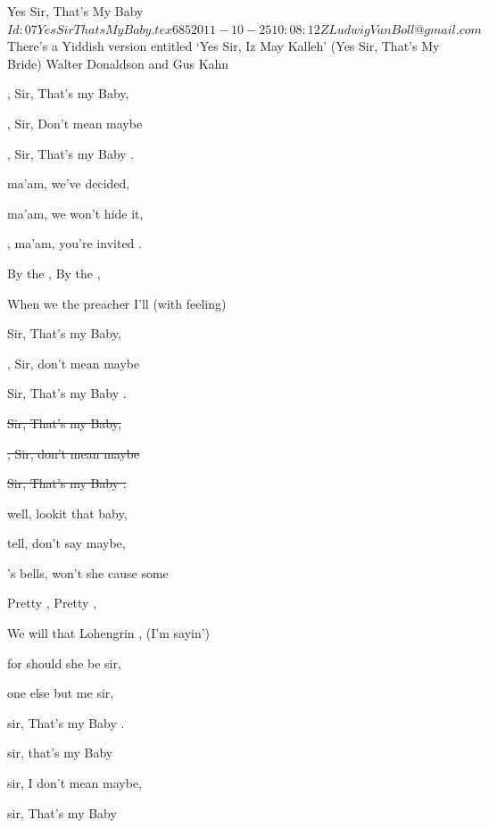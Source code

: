 \begin{SBSong}{Yes Sir, That's My Baby}
  {$Id: 07YesSirThatsMyBaby.tex 685 2011-10-25 10:08:12Z LudwigVanBoll@gmail.com $}
  {There's a Yiddish version entitled `Yes Sir, Iz May Kalleh' (Yes Sir, That's My Bride)}
  {Walter Donaldson and Gus Kahn}
  \begin{SBVerse*}
    , Sir, That's my Baby,
    
    , Sir, Don't mean maybe
    
    , Sir, That's my Baby . 
    
     ma'am, we've decided,
    
     ma'am, we won't hide it,
    
    , ma'am, you're invited .
    
    By the , By the ,
    
    When we  the preacher I'll  (with feeling)
    
     Sir, That's my Baby,
    
    , Sir, don't mean maybe
    
     Sir, That's my Baby . 
    
    \sout{ Sir, That's my Baby,}
    
    \sout{, Sir, don't mean maybe}
    
    \sout{ Sir, That's my Baby . }
    
     well, lookit that baby,
    
     tell, don't say maybe,
    
    's bells, won't she cause some 
    
    Pretty , Pretty ,
    
    We will  that Lohengrin , (I'm sayin')
    
     for should she be sir,
    
     one else but me sir,
    
     sir, That's my Baby . 
    
     sir, that's my Baby
    
     sir, I don't mean maybe,
    
     sir, That's my Baby 
 \end{SBVerse*}
\end{SBSong}
